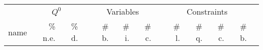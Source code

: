 {\tiny
\begin{longtable}{lrrrrrrrrrrrr}
\toprule

	&		\multicolumn{2}{c}{$Q^0$}		&	&	\multicolumn{3}{c}{Variables}					&	&	\multicolumn{4}{c}{Constraints}							\\
name	&	\% n.e.	&	\% d.	&	&	\# b.	&	\# i. 	&	\# c. 	&	&	\# l. 	&	\# q. 	&	\# c. 	&	\# b.	\\[2 ex]

\endhead 														


\end{longtable}}

